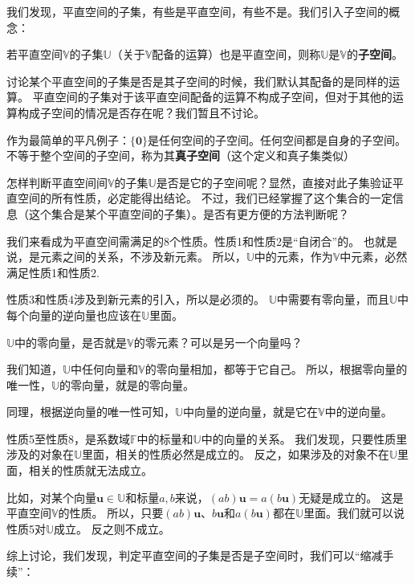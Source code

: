 \documentclass[12pt,UTF8,fontset=none]{ctexbook}
\begin{document}
我们发现，平直空间的子集，有些是平直空间，有些不是。我们引入子空间的概念：
\begin{df}\label{df:1_2}
    若平直空间$\mathbb{V}$的子集$\mathbb{U}$（关于$\mathbb{V}$配备的运算）也是平直空间，则称$\mathbb{U}$是$\mathbb{V}$的{\bfseries 子空间}。
\end{df}

讨论某个平直空间的子集是否是其子空间的时候，我们默认其配备的是同样的运算。
平直空间的子集对于该平直空间配备的运算不构成子空间，但对于其他的运算构成子空间的情况是否存在呢？我们暂且不讨论。

作为最简单的平凡例子：$\{\mathbf{0}\}$是任何空间的子空间。任何空间都是自身的子空间。不等于整个空间的子空间，称为其{\bfseries 真子空间}（这个定义和真子集类似）

怎样判断平直空间间$\mathbb{V}$的子集$\mathbb{U}$是否是它的子空间呢？显然，直接对此子集验证平直空间的所有性质，必定能得出结论。
不过，我们已经掌握了这个集合的一定信息（这个集合是某个平直空间的子集）。是否有更方便的方法判断呢？

我们来看成为平直空间需满足的8个性质。性质1和性质2是“自闭合”的。
也就是说，是元素之间的关系，不涉及新元素。
所以，$\mathbb{U}$中的元素，作为$\mathbb{V}$中元素，必然满足性质1和性质2.

性质3和性质4涉及到新元素的引入，所以是必须的。
$\mathbb{U}$中需要有零向量，而且$\mathbb{U}$中每个向量的逆向量也应该在$\mathbb{U}$里面。

$\mathbb{U}$中的零向量，是否就是$\mathbb{V}$的零元素？可以是另一个向量吗？

我们知道，$\mathbb{U}$中任何向量和$\mathbb{V}$的零向量相加，都等于它自己。
所以，根据零向量的唯一性，$\mathbb{U}$的零向量，就是$\mathbb{}$的零向量。

同理，根据逆向量的唯一性可知，$\mathbb{U}$中向量的逆向量，就是它在$\mathbb{V}$中的逆向量。

性质5至性质8，是系数域$\mathbb{F}$中的标量和$\mathbb{U}$中的向量的关系。
我们发现，只要性质里涉及的对象在$\mathbb{U}$里面，相关的性质必然是成立的。
反之，如果涉及的对象不在$\mathbb{U}$里面，相关的性质就无法成立。

比如，对某个向量$\mathbf{u} \in \mathbb{U}$和标量$a, b$来说，$(ab)\mathbf{u} = a(b\mathbf{u})$无疑是成立的。
这是平直空间$\mathbb{V}$的性质。
所以，只要$(ab)\mathbf{u}$、$b\mathbf{u}$和$a(b\mathbf{u})$都在$\mathbb{U}$里面。我们就可以说性质5对$\mathbb{U}$成立。
反之则不成立。

综上讨论，我们发现，判定平直空间的子集是否是子空间时，我们可以“缩减手续”：
\end{document}
